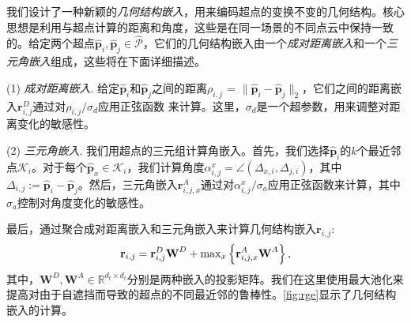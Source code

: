 我们设计了一种新颖的\emph{几何结构嵌入}，用来编码超点的变换不变的几何结构。核心思想是利用与超点计算的距离和角度，这些是在同一场景的不同点云中保持一致的。给定两个超点$\hat{\textbf{p}}_i, \hat{\textbf{p}}_j \in \hat{\mathcal{P}}$，它们的几何结构嵌入由一个\emph{成对距离嵌入}和一个\emph{三元角嵌入}组成，这些将在下面详细描述。

(1) \emph{成对距离嵌入}.
给定$\hat{\textbf{p}}_i$和$\hat{\textbf{p}}_j$之间的距离$\rho_{i, j} \hspace{1pt} {=} \hspace{1pt} \lVert \hat{\textbf{p}}_i - \hat{\textbf{p}}_j \rVert_2$，它们之间的距离嵌入$\textbf{r}^D_{i, j}$通过对$\rho_{i, j} / \sigma_d$应用正弦函数 \cite{vaswani2017attention}来计算。这里，$\sigma_d$是一个超参数，用来调整对距离变化的敏感性。

(2) \emph{三元角嵌入}.
我们用超点的三元组计算角嵌入。首先，我们选择$\hat{\textbf{p}}_i$的$k$个最近邻点$\mathcal{K}_i$。对于每个$\hat{\textbf{p}}_x \in \mathcal{K}_i$，我们计算角度$\alpha^x_{i,j} = \angle(\Delta_{x, i}, \Delta_{j, i})$，其中$\Delta_{i, j} := \hat{\textbf{p}}_i - \hat{\textbf{p}}_j$。然后，三元角嵌入$\textbf{r}^A_{i, j, x}$通过对$\alpha^x_{i,j} / \sigma_a$应用正弦函数来计算，其中$\sigma_a$控制对角度变化的敏感性。

最后，通过聚合成对距离嵌入和三元角嵌入来计算几何结构嵌入$\textbf{r}_{i, j}$:
\vspace{-5pt}
\begin{equation}
\textbf{r}_{i, j} = \textbf{r}^D_{i, j}\textbf{W}^D + {\max}_x\left\{\textbf{r}^A_{i, j, x}\textbf{W}^A\right\},
\vspace{-5pt}
\label{eq:gse}
\end{equation}
其中，$\textbf{W}^D, \textbf{W}^A \in \mathbb{R}^{d_t \times d_t}$分别是两种嵌入的投影矩阵。我们在这里使用最大池化来提高对由于自遮挡而导致的超点的不同最近邻的鲁棒性。\ref{fig:rge}显示了几何结构嵌入的计算。



